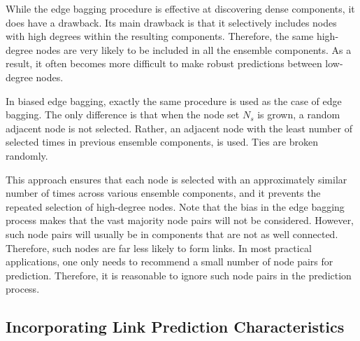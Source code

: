 While the edge bagging procedure is effective at discovering dense
components, it does have a drawback. Its main drawback is that  it
selectively includes nodes with  high degrees within the resulting
components.  Therefore, the same high-degree nodes are very likely to be included in
all the ensemble components.  As a result, it often becomes more
difficult to make robust predictions between low-degree nodes.

In biased edge bagging, exactly the same procedure is used as the case
of edge bagging.  The only difference is that when the node set
$N_s$ is grown, a random adjacent node is not selected. Rather, an
adjacent node with the least number of selected times
in previous ensemble components, is used. Ties are broken randomly.

This approach ensures  that each node is selected with an approximately
similar number of times across various ensemble components, and it
prevents the repeated selection of high-degree nodes.
%
Note that the
bias in the edge bagging process makes that the vast majority node
pairs will not be considered.
However, such node pairs will usually be in components that are not
as well connected. Therefore, such nodes  are far less likely to
form links. In most practical applications, one only needs to
recommend a small number of node pairs for prediction.  Therefore,
it is reasonable to ignore such node pairs in the prediction
process.



\subsection{Incorporating Link Prediction Characteristics}
\label{subsec-lp-char}



